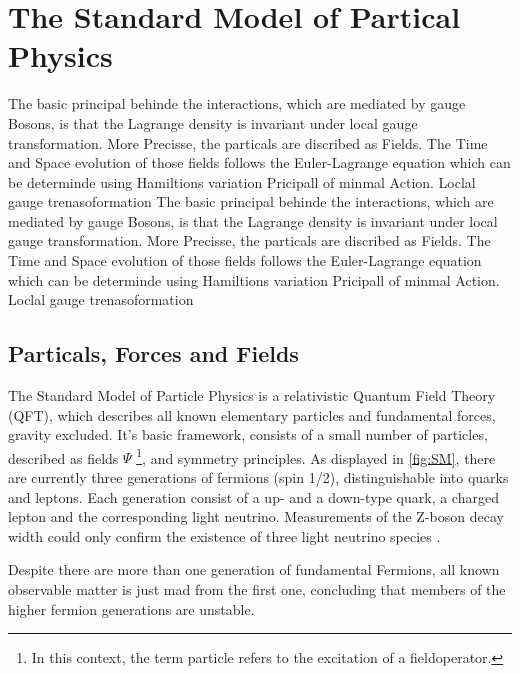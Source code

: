 \chapter{The Standard Model of Partical Physics}
\label{sec:SM}
The basic principal behinde the interactions, which are mediated by gauge Bosons, is  that the Lagrange density is invariant under local gauge transformation. More Precisse, the particals are discribed as Fields. The Time and Space evolution of those fields follows the Euler-Lagrange equation which can be determinde using Hamiltions variation Pricipall of minmal Action. 
Loclal gauge trenasoformation
The basic principal behinde the interactions, which are mediated by gauge Bosons, is  that the Lagrange density is invariant under local gauge transformation. More Precisse, the particals are discribed as Fields. The Time and Space evolution of those fields follows the Euler-Lagrange equation which can be determinde using Hamiltions variation Pricipall of minmal Action. 
Loclal gauge trenasoformation




\section{Particals, Forces and Fields}\label{key:SM 2}


The Standard Model of Particle Physics \cite{glashow1961partial,glashow1970weak,gross1973asymptotically,politzer1973reliable,politzer1974asymptotic,salam1964electromagnetic,weinberg1967model} is a relativistic Quantum Field Theory (QFT), which describes all known elementary particles and fundamental forces, gravity excluded.  It's basic framework, consists of a small number of particles, described as fields $\Psi$ \footnote{In this context, the term particle refers to the excitation of a fieldoperator. }, and symmetry principles. As displayed in \cref{fig:SM}, there are currently three generations of fermions (spin 1/2), distinguishable into quarks and leptons. Each generation consist of a up- and a down-type quark, a charged lepton and the corresponding light neutrino. Measurements of the Z-boson decay width could only confirm the existence of three light neutrino species \cite{schael2006aleph}. 

Despite there are more than one generation of fundamental Fermions, all known observable matter is just mad from the first one, concluding that members of the higher fermion generations are unstable. 
\\

